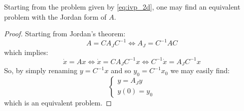\begin{proposition}
    Starting from the problem given by \autoref{eq:ivp_2d}, one may find an equivalent problem with the Jordan form of $A$.
\end{proposition}
\begin{proof}
    Starting from Jordan's theorem:
    \begin{equation*}
        A=CA_JC^{-1}\Leftrightarrow A_J=C^{-1}AC
    \end{equation*}
    which implies:
    \begin{equation*}
        \dot{x}=Ax\Leftrightarrow\dot{x}=CA_JC^{-1}x\Leftrightarrow C^{-1}\dot{x}=A_JC^{-1}x
    \end{equation*}
    So, by simply renaming $y=C^{-1}x$ and so $y_0=C^{-1}x_0$ we may easily find:\begin{equation*}
        \begin{cases}
            y=A_Jy \\
            y(0)=y_0
        \end{cases}
    \end{equation*}
    which is an equivalent problem.
\end{proof}

